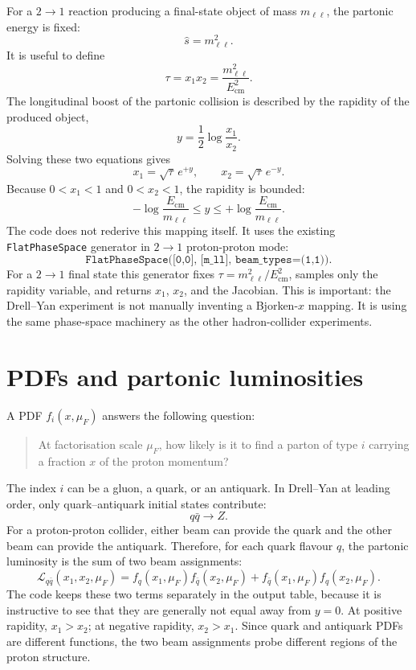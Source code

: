 \documentclass[11pt]{article}
\newcommand{\mll}{m_{\ell\ell}}
\newcommand{\shat}{\hat s}
\newcommand{\ecm}{E_{\mathrm{cm}}}
\begin{document}
For a \(2\to1\) reaction producing a final-state object of mass \(\mll\), the
partonic energy is fixed:
\[
  \shat = \mll^2 .
\]
It is useful to define
\[
  \tau = x_1 x_2 = \frac{\mll^2}{\ecm^2}.
\]
The longitudinal boost of the partonic collision is described by the rapidity
of the produced object,
\[
  y = \frac{1}{2}\log\frac{x_1}{x_2}.
\]
Solving these two equations gives
\[
  x_1 = \sqrt{\tau}\,e^{+y}, \qquad
  x_2 = \sqrt{\tau}\,e^{-y}.
\]
Because \(0<x_1<1\) and \(0<x_2<1\), the rapidity is bounded:
\[
  -\log\frac{\ecm}{\mll}
  \le y \le
  +\log\frac{\ecm}{\mll}.
\]
The code does not rederive this mapping itself.  It uses the existing
\texttt{FlatPhaseSpace} generator in \(2\to1\) proton-proton mode:
\[
  \texttt{FlatPhaseSpace([0,0], [m\_ll], beam\_types=(1,1))}.
\]
For a \(2\to1\) final state this generator fixes \(\tau=\mll^2/\ecm^2\), samples
only the rapidity variable, and returns \(x_1\), \(x_2\), and the Jacobian.
This is important: the Drell--Yan experiment is not manually inventing a
Bjorken-\(x\) mapping.  It is using the same phase-space machinery as the other
hadron-collider experiments.

\section{PDFs and partonic luminosities}

A PDF \(f_i(x,\mu_F)\) answers the following question:
\begin{quote}
  At factorisation scale \(\mu_F\), how likely is it to find a parton of type
  \(i\) carrying a fraction \(x\) of the proton momentum?
\end{quote}
The index \(i\) can be a gluon, a quark, or an antiquark.  In Drell--Yan at
leading order, only quark--antiquark initial states contribute:
\[
  q\bar q \to Z .
\]
For a proton-proton collider, either beam can provide the quark and the other
beam can provide the antiquark.  Therefore, for each quark flavour \(q\), the
partonic luminosity is the sum of two beam assignments:
\[
  \mathcal{L}_{q\bar q}(x_1,x_2,\mu_F)
  =
  f_q(x_1,\mu_F) f_{\bar q}(x_2,\mu_F)
  +
  f_{\bar q}(x_1,\mu_F) f_q(x_2,\mu_F).
\]
The code keeps these two terms separately in the output table, because it is
instructive to see that they are generally not equal away from \(y=0\).
At positive rapidity, \(x_1>x_2\); at negative rapidity, \(x_2>x_1\).  Since
quark and antiquark PDFs are different functions, the two beam assignments
probe different regions of the proton structure.
\end{document}
